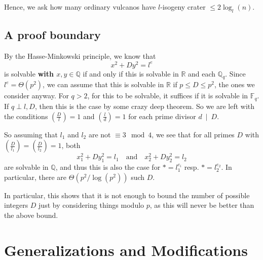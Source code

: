\documentclass{scrartcl}
\newcommand{\F}{\mathbb{F}}
\newcommand{\divides}{\ \mid \ }
\theoremstyle{definition}
\begin{document}
Hence, we ask how many ordinary vulcanos have $l$-isogeny crater $\leq 2\log_l(n)$.

\subsection*{A proof boundary}
By the Hasse-Minkowski principle, we know that
\begin{equation*}
    x^2 + D y^2 = l^e
\end{equation*}
is solvable \textbf{with $x, y \in \mathbb{Q}$} if and only if this is solvable in $\mathbb{R}$ and each $\mathbb{Q}_q$.
Since $l^e = \Theta(p^2)$, we can assume that this is solvable in $\mathbb{R}$ if $p \leq D \leq p^2$, the ones we consider anyway.
For $q > 2$, for this to be solvable, it suffices if it is solvable in $\F_q$.
If $q \perp l, D$, then this is the case by some crazy deep theorem.
So we are left with the conditions $(\frac D l) = 1$ and $(\frac l d) = 1$ for each prime divisor $d \divides D$.

So assuming that $l_1$ and $l_2$ are not $\equiv 3 \mod 4$, we see that for all primes $D$ with $(\frac D {l_1}) = (\frac D {l_2}) = 1$, both
\begin{equation*}
    x_1^2 + Dy_1^2 = l_1 \quad \text{and} \quad x_2^2 + Dy_2^2 = l_2
\end{equation*}
are solvable in $\mathbb{Q}$, and thus this is also the case for $* = l_1^{e_i}$ resp. $* = l_2^{e_2}$.
In particular, there are $\Theta(p^2/\log(p^2))$ such $D$.

In particular, this shows that it is not enough to bound the number of possible integers $D$ just by considering things modulo $p$, as this will never be better than the above bound.

\section{Generalizations and Modifications}
\end{document}

